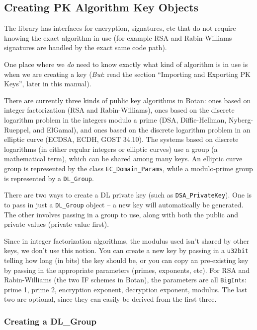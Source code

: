 \documentclass{article}
\newcommand{\type}[1]{\texttt{#1}}
\begin{document}
\subsection{Creating PK Algorithm Key Objects}

The library has interfaces for encryption, signatures, etc that do not require
knowing the exact algorithm in use (for example RSA and Rabin-Williams
signatures are handled by the exact same code path).

One place where we \emph{do} need to know exactly what kind of
algorithm is in use is when we are creating a key (\emph{But}: read
the section ``Importing and Exporting PK Keys'', later in this
manual).

There are currently three kinds of public key algorithms in Botan:
ones based on integer factorization (RSA and Rabin-Williams), ones
based on the discrete logarithm problem in the integers modulo a prime
(DSA, Diffie-Hellman, Nyberg-Rueppel, and ElGamal), and ones based on
the discrete logarithm problem in an elliptic curve (ECDSA, ECDH, GOST
34.10). The systems based on discrete logarithms (in either regular
integers or elliptic curves) use a group (a mathematical term), which
can be shared among many keys. An elliptic curve group is represented
by the class \type{EC\_Domain\_Params}, while a modulo-prime group is
represented by a \type{DL\_Group}.

There are two ways to create a DL private key (such as
\type{DSA\_PrivateKey}). One is to pass in just a \type{DL\_Group}
object -- a new key will automatically be generated. The other
involves passing in a group to use, along with both the public and
private values (private value first).

Since in integer factorization algorithms, the modulus used isn't shared by
other keys, we don't use this notion. You can create a new key by passing in a
\type{u32bit} telling how long (in bits) the key should be, or you can copy an
pre-existing key by passing in the appropriate parameters (primes, exponents,
etc). For RSA and Rabin-Williams (the two IF schemes in Botan), the parameters
are all \type{BigInt}s: prime 1, prime 2, encryption exponent, decryption
exponent, modulus. The last two are optional, since they can easily be derived
from the first three.

\subsubsection{Creating a DL\_Group}
\end{document}
